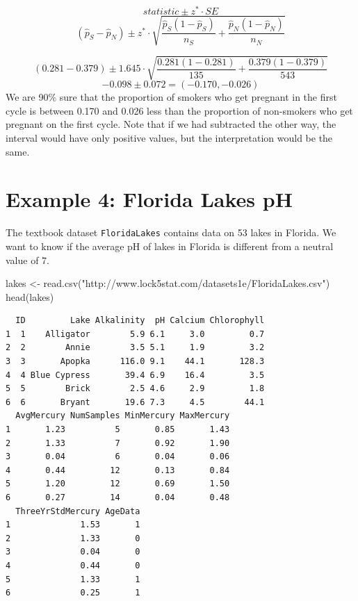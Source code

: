 \documentclass[
]{book}
\newenvironment{Shaded}{\begin{snugshade}}{\end{snugshade}}
\newcommand{\FunctionTok}[1]{\textcolor[rgb]{0.00,0.00,0.00}{#1}}
\newcommand{\NormalTok}[1]{#1}
\newcommand{\OtherTok}[1]{\textcolor[rgb]{0.56,0.35,0.01}{#1}}
\newcommand{\StringTok}[1]{\textcolor[rgb]{0.31,0.60,0.02}{#1}}
\begin{document}
\[statistic \pm z^* \cdot SE \]
\[(\hat{p}_S - \hat{p}_N) \pm z^* \cdot \sqrt{\frac{\hat{p}_S(1- \hat{p}_S)}{n_S} + \frac{\hat{p}_N(1- \hat{p}_N)}{n_N}} \]

\[(0.281 - 0.379) \pm 1.645\cdot \sqrt{\frac{0.281(1-0.281)}{135} + \frac{0.379(1-0.379)}{543}} \]
\[-0.098 \pm 0.072 = (-0.170, -0.026) \]
We are 90\% sure that the proportion of smokers who get pregnant in the first cycle is between 0.170 and 0.026 less than the proportion of non-smokers who get pregnant on the first cycle. Note that if we had subtracted the other way, the interval would have only positive values, but the interpretation would be the same.

\hypertarget{example-4-florida-lakes-ph}{%
\section{Example 4: Florida Lakes pH}\label{example-4-florida-lakes-ph}}

The textbook dataset \texttt{FloridaLakes} contains data on 53 lakes in Florida. We want to know if the average pH of lakes in Florida is different from a neutral value of 7.

\begin{Shaded}
\begin{Highlighting}[]
\NormalTok{lakes }\OtherTok{\textless{}{-}} \FunctionTok{read.csv}\NormalTok{(}\StringTok{"http://www.lock5stat.com/datasets1e/FloridaLakes.csv"}\NormalTok{)}
\FunctionTok{head}\NormalTok{(lakes)}
\end{Highlighting}
\end{Shaded}

\begin{verbatim}
  ID         Lake Alkalinity  pH Calcium Chlorophyll
1  1    Alligator        5.9 6.1     3.0         0.7
2  2        Annie        3.5 5.1     1.9         3.2
3  3       Apopka      116.0 9.1    44.1       128.3
4  4 Blue Cypress       39.4 6.9    16.4         3.5
5  5        Brick        2.5 4.6     2.9         1.8
6  6       Bryant       19.6 7.3     4.5        44.1
  AvgMercury NumSamples MinMercury MaxMercury
1       1.23          5       0.85       1.43
2       1.33          7       0.92       1.90
3       0.04          6       0.04       0.06
4       0.44         12       0.13       0.84
5       1.20         12       0.69       1.50
6       0.27         14       0.04       0.48
  ThreeYrStdMercury AgeData
1              1.53       1
2              1.33       0
3              0.04       0
4              0.44       0
5              1.33       1
6              0.25       1
\end{verbatim}
\end{document}
